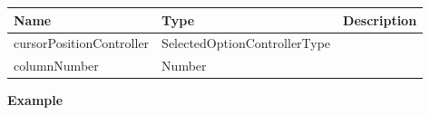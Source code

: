 \begin{table}[!htb] 
    \label{api:columnOptionsComponentParameter}
    \footnotesize
    \setlength\extrarowheight{4pt}
    \begin{tabular}{ p{3.2cm} p{4.2cm} p{5.6cm} }
        \toprule[1.2pt]
        \textbf{Name}            & \textbf{Type}                & \textbf{Description} \\
        \midrule
        cursorPositionController & SelectedOptionControllerType &  \\
        columnNumber             & Number                       &  \\
        \bottomrule[1.2pt]
    \end{tabular}
\end{table}

\vspace*{6pt}
\noindent
\textbf{Example}


